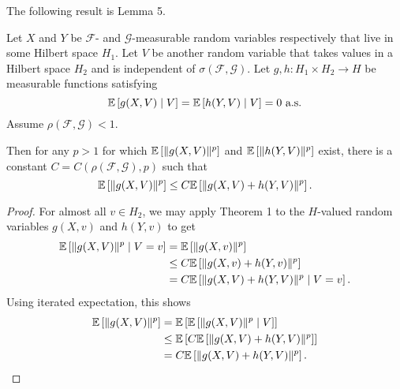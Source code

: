 The following result is \cite{[0]BUCCHIA2017344} Lemma 5.
\begin{lemma} \label{lemma:5}
    Let $X$ and $Y$ be $\mathcal{F}$- and $\mathcal{G}$-measurable random variables respectively that live in some Hilbert space $H_1$. Let $V$ be another random variable that takes values in a Hilbert space $H_2$ and is independent of $\sigma(\mathcal{F}, \mathcal{G})$. Let $g, h: H_1 \times H_2 \to H$ be measurable functions satisfying 
    \[  \mathbb{E}\left[g(X, V)\mid V\right] = \mathbb{E}\left[h(Y, V) \mid V\right] = 0 \ \text{a.s.}\]
    Assume $\rho(\mathcal{F}, \mathcal{G}) < 1$.
    
    Then for any $p > 1$ for which $\mathbb{E}\left[\| g(X, V)\|^p\right]$ and $ \mathbb{E}\left[\|h(Y, V)\|^p\right]$ exist, there is a constant $C = C(\rho(\mathcal{F}, \mathcal{G}), p)$ such that
    \[ \mathbb{E}\left[\| g(X, V)\|^p\right] \leq C \mathbb{E}\left[\| g(X, V) + h(Y, V) \|^p\right]. \]
\end{lemma}
\begin{proof}
    For almost all $v \in H_2$, we may apply \cite{[56]zhang1998rosenthal} Theorem 1 to the $H$-valued random variables $g(X, v)$ and $h(Y, v)$ to get
    \begin{align*}
        \mathbb{E}\left[\|g(X, V)\|^p \mid V = v\right] 
        & = \mathbb{E}\left[\|g(X, v)\|^p\right] \\
        & \leq C \mathbb{E}\left[\| g(X, v) + h(Y, v) \|^p\right] \\
        & = C \mathbb{E}\left[\| g(X, V) + h(Y, V) \|^p \mid V = v\right]. 
    \end{align*}
    Using iterated expectation, this shows
    \begin{align*}
        \mathbb{E}\left[\|g(X, V) \|^p\right]
        & = \mathbb{E}\left[\mathbb{E}\left[\|g(X, V)\|^p \mid V\right]\right] \\
        & \leq \mathbb{E}\left[C \mathbb{E}\left[\| g(X, V) + h(Y, V) \|^p\right]\right] \\
        & = C \mathbb{E}\left[\| g(X, V) + h(Y, V) \|^p\right].
    \end{align*}
\end{proof}
